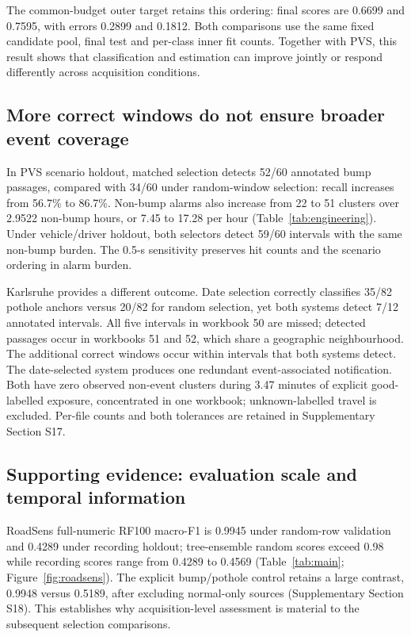 The common-budget outer target retains this ordering: final scores are 0.6699 and 0.7595, with errors 0.2899 and 0.1812. Both comparisons use the same fixed candidate pool, final test and per-class inner fit counts. Together with PVS, this result shows that classification and estimation can improve jointly or respond differently across acquisition conditions.

\subsection{More correct windows do not ensure broader event coverage}
In PVS scenario holdout, matched selection detects 52/60 annotated bump passages, compared with 34/60 under random-window selection: recall increases from 56.7\% to 86.7\%. Non-bump alarms also increase from 22 to 51 clusters over 2.9522 non-bump hours, or 7.45 to 17.28 per hour (Table~\ref{tab:engineering}). Under vehicle/driver holdout, both selectors detect 59/60 intervals with the same non-bump burden. The 0.5-s sensitivity preserves hit counts and the scenario ordering in alarm burden.

Karlsruhe provides a different outcome. Date selection correctly classifies 35/82 pothole anchors versus 20/82 for random selection, yet both systems detect 7/12 annotated intervals. All five intervals in workbook 50 are missed; detected passages occur in workbooks 51 and 52, which share a geographic neighbourhood. The additional correct windows occur within intervals that both systems detect. The date-selected system produces one redundant event-associated notification. Both have zero observed non-event clusters during 3.47 minutes of explicit good-labelled exposure, concentrated in one workbook; unknown-labelled travel is excluded. Per-file counts and both tolerances are retained in Supplementary Section S17.

\subsection{Supporting evidence: evaluation scale and temporal information}
RoadSens full-numeric RF100 macro-F1 is 0.9945 under random-row validation and 0.4289 under recording holdout; tree-ensemble random scores exceed 0.98 while recording scores range from 0.4289 to 0.4569 (Table~\ref{tab:main}; Figure~\ref{fig:roadsens}). The explicit bump/pothole control retains a large contrast, 0.9948 versus 0.5189, after excluding normal-only sources (Supplementary Section S18). This establishes why acquisition-level assessment is material to the subsequent selection comparisons.

